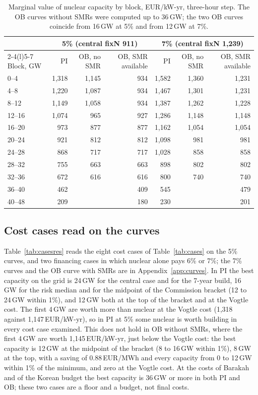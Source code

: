 \begin{table}[!tb]
\centering\footnotesize
\caption{Marginal value of nuclear capacity by block, EUR/kW-yr, three-hour step. The OB curves without SMRs were computed up to 36\,GW; the two OB curves coincide from 16\,GW at 5\% and from 12\,GW at 7\%.}\label{tab:value}
\begin{tabular}{@{}lrrrrrr@{}}
\toprule
 & \multicolumn{3}{c}{5\% (central fixN 911)} & \multicolumn{3}{c}{7\% (central fixN 1{,}239)}\\
\cmidrule(lr){2-4}\cmidrule(l){5-7}
Block, GW & PI & OB, no SMR & OB, SMR available & PI & OB, no SMR & OB, SMR available\\
\midrule
0--4 & 1{,}318 & 1{,}145 & 934 & 1{,}582 & 1{,}360 & 1{,}231\\
4--8 & 1{,}220 & 1{,}087 & 934 & 1{,}467 & 1{,}301 & 1{,}231\\
8--12 & 1{,}149 & 1{,}058 & 934 & 1{,}387 & 1{,}262 & 1{,}228\\
12--16 & 1{,}074 & 965 & 927 & 1{,}286 & 1{,}148 & 1{,}148\\
16--20 & 973 & 877 & 877 & 1{,}162 & 1{,}054 & 1{,}054\\
20--24 & 921 & 812 & 812 & 1{,}098 & 981 & 981\\
24--28 & 868 & 717 & 717 & 1{,}028 & 858 & 858\\
28--32 & 755 & 663 & 663 & 898 & 802 & 802\\
32--36 & 672 & 616 & 616 & 800 & 740 & 740\\
36--40 & 462 & & 409 & 545 & & 479\\
40--48 & 209 & & 180 & 230 & & 201\\
\bottomrule
\end{tabular}
\end{table}

\subsection{Cost cases read on the curves}\label{sec:casesres}
Table~\ref{tab:casesres} reads the eight cost cases of Table~\ref{tab:cases} on the 5\% curves, and two financing cases in which nuclear alone pays 6\% or 7\%; the 7\% curves and the OB curve with SMRs are in Appendix~\ref{app:curves}. In PI the best capacity on the grid is 24\,GW for the central case and for the 7-year build, 16\,GW for the risk median and for the midpoint of the Commission bracket (12 to 24\,GW within 1\%), and 12\,GW both at the top of the bracket and at the Vogtle cost. The first 4\,GW are worth more than nuclear at the Vogtle cost (1{,}318 against 1{,}147\,EUR/kW-yr), so in PI at 5\% some nuclear is worth building in every cost case examined. This does not hold in OB without SMRs, where the first 4\,GW are worth 1{,}145\,EUR/kW-yr, just below the Vogtle cost: the best capacity is 12\,GW at the midpoint of the bracket (8 to 16\,GW within 1\%), 8\,GW at the top, with a saving of 0.88\,EUR/MWh and every capacity from 0 to 12\,GW within 1\% of the minimum, and zero at the Vogtle cost. At the costs of Barakah and of the Korean budget the best capacity is 36\,GW or more in both PI and OB; these two cases are a floor and a budget, not final costs.

